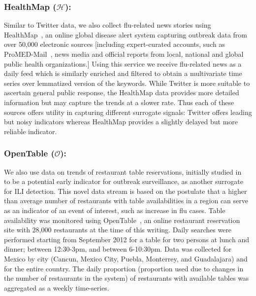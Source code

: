 \subsubsection{HealthMap ($\mathcal{H}$):} 
Similar to Twitter data, we also collect flu-related
news stories using HealthMap~\cite{HM:2013}, an online global disease alert
system capturing outbreak data from over 50,000 electronic sources [including
expert-curated accounts, such as ProMED-Mail~\cite{chase1996promed}, news media
and official reports from local, national and global public health
organizations.] Using this service we receive flu-related news as a daily feed
which is similarly enriched and filtered to obtain
a multivariate time series over lemmatized version of the keywords. 
While Twitter is more suitable to ascertain general public response, the
HealthMap data provides more detailed information but may capture the trends
at a slower rate. Thus each of these sources offers utility in
capturing different surrogate signals: Twitter offers leading but noisy
indicators whereas HealthMap provides a slightly delayed but more reliable
indicator.

\subsubsection{OpenTable ($\mathcal{O}$):}
We also use data on trends of restaurant table reservations, initially 
studied in~\cite{elaine2013opentable} to be a potential early indicator for
outbreak surveillance, as another surrogate for ILI detection.
This novel data stream is based on the
postulate that a higher than average number of restaurants with table
availabilities in a region can serve as an indicator of an event of interest,
such as increase in flu cases. Table availability was monitored using OpenTable~\cite{Opentable:2013}, 
an online restaurant reservation site with 28,000 restaurants at the time
of this writing. Daily searches were performed starting from September 2012 for
a table for two persons at lunch and dinner; between 12:30-3pm, and between
6-10:30pm. Data was collected for Mexico by city (Cancun, Mexico City, Puebla,
Monterrey, and Guadalajara) and for the entire country. The daily proportion
(proportion used due to changes in the number of restaurants in the system) of
restaurants with available tables was aggregated as a weekly time-series.

